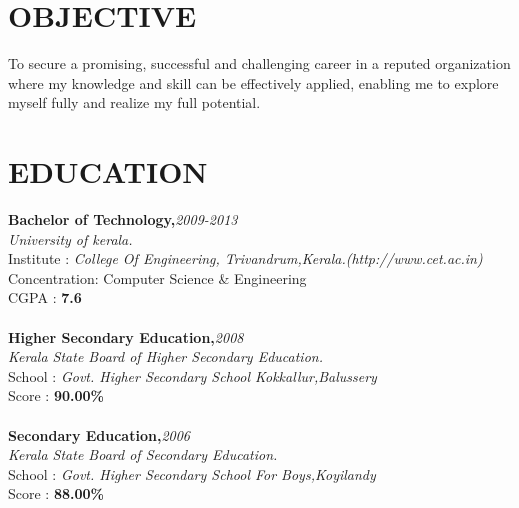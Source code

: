 \documentclass[line,margin]{res}
\begin{document}
\address{\large akhilpm135@gmail.com}
\address{\large (+91)9961558915}

\thispagestyle{empty} %

\begin{resume}
  
  	  \section{OBJECTIVE}       
  		  To secure a promising, successful and challenging career in a reputed organization where my knowledge and skill can be effectively applied, enabling me to explore myself fully and realize my full potential.\\
  
  	  \section{EDUCATION} 
          	  {\bf Bachelor of Technology,}\hfill {\it 2009-2013}\\
          	  {\it University of kerala.}\\ 
          	  Institute : {\it College Of Engineering, Trivandrum,Kerala.\hfill(http://www.cet.ac.in)} \\
           	  Concentration: Computer Science \& Engineering \\ 
          	  CGPA : {\bf 7.6} \\\\
          	  {\bf Higher Secondary Education,}\hfill {\it 2008}\\        
          	  {\it Kerala State Board of Higher Secondary Education.}\\
          	  School : {\it Govt. Higher Secondary School Kokkallur,Balussery}\\
          	  Score       : {\bf 90.00\% } \\\\
          	  {\bf Secondary Education,}\hfill {\it 2006}\\
          	  {\it Kerala State Board of Secondary Education.}\\
          	  School : {\it Govt. Higher Secondary School For Boys,Koyilandy} \\ 
          	  Score       : {\bf 88.00\% } \\

\end{resume}
\end{document}
